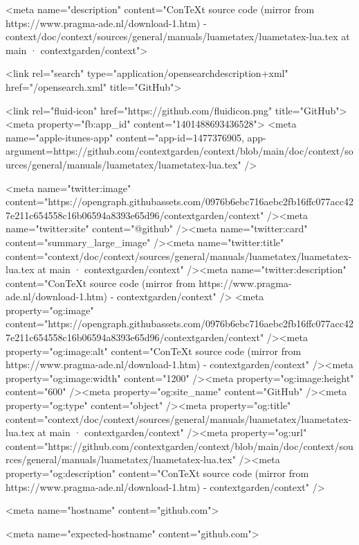    

      <meta name="description" content="ConTeXt source code (mirror from https://www.pragma-ade.nl/download-1.htm) - context/doc/context/sources/general/manuals/luametatex/luametatex-lua.tex at main · contextgarden/context">

      <link rel="search" type="application/opensearchdescription+xml" href="/opensearch.xml" title="GitHub">

    <link rel="fluid-icon" href="https://github.com/fluidicon.png" title="GitHub">
    <meta property="fb:app_id" content="1401488693436528">
    <meta name="apple-itunes-app" content="app-id=1477376905, app-argument=https://github.com/contextgarden/context/blob/main/doc/context/sources/general/manuals/luametatex/luametatex-lua.tex" />

      <meta name="twitter:image" content="https://opengraph.githubassets.com/0976b6ebc716aebc2fb16ffc077acc427e211c654558c16b06594a8393e65d96/contextgarden/context" /><meta name="twitter:site" content="@github" /><meta name="twitter:card" content="summary_large_image" /><meta name="twitter:title" content="context/doc/context/sources/general/manuals/luametatex/luametatex-lua.tex at main · contextgarden/context" /><meta name="twitter:description" content="ConTeXt source code (mirror from https://www.pragma-ade.nl/download-1.htm) - contextgarden/context" />
  <meta property="og:image" content="https://opengraph.githubassets.com/0976b6ebc716aebc2fb16ffc077acc427e211c654558c16b06594a8393e65d96/contextgarden/context" /><meta property="og:image:alt" content="ConTeXt source code (mirror from https://www.pragma-ade.nl/download-1.htm) - contextgarden/context" /><meta property="og:image:width" content="1200" /><meta property="og:image:height" content="600" /><meta property="og:site_name" content="GitHub" /><meta property="og:type" content="object" /><meta property="og:title" content="context/doc/context/sources/general/manuals/luametatex/luametatex-lua.tex at main · contextgarden/context" /><meta property="og:url" content="https://github.com/contextgarden/context/blob/main/doc/context/sources/general/manuals/luametatex/luametatex-lua.tex" /><meta property="og:description" content="ConTeXt source code (mirror from https://www.pragma-ade.nl/download-1.htm) - contextgarden/context" />
  




      <meta name="hostname" content="github.com">



        <meta name="expected-hostname" content="github.com">


